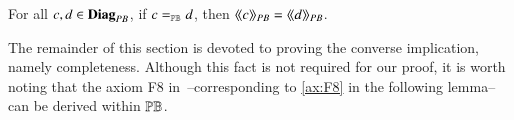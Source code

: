 \begin{proposition}[Soundness]\label{prop:soundnesspartialb}
For all $c,d\in \mathbf{Diag}_{PB}$, if $c\eqPB d$, then $\langle\!\langle{c}\rangle\! \rangle_{PB}=\langle\!\langle{d}\rangle\! \rangle_{PB}$.
\end{proposition}


















The remainder of this section is devoted to proving the converse implication, namely completeness. 
Although this fact is not required for our proof, it is worth noting that the axiom \textsc{F8} in~\cite{piedeleu2025boolean}--corresponding to \eqref{ax:F8} in the following lemma--can be derived within $\mathbb{PB}$. 

